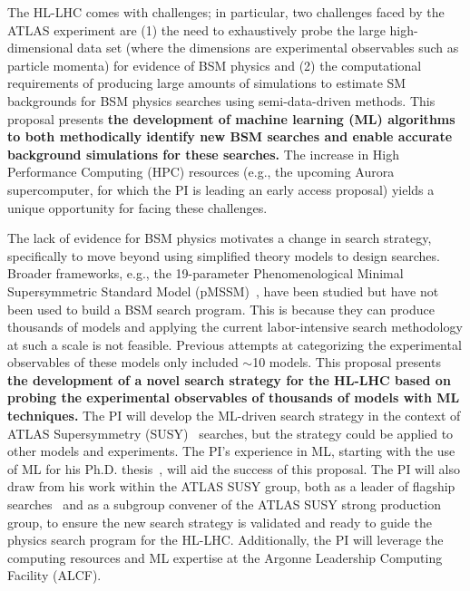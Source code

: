 \documentclass[letter, USenglish, 11pt, subfigure]{article}
\begin{document}
The HL-LHC comes with challenges; in particular, two challenges faced by the ATLAS experiment are (1) the need to exhaustively probe the large high-dimensional data set (where the dimensions are experimental observables such as particle momenta) for evidence of BSM physics and (2) the computational requirements of producing large amounts of simulations to estimate SM backgrounds for BSM physics searches using semi-data-driven methods. This proposal presents {\bf the development of machine learning (ML) algorithms to both methodically identify new BSM searches and enable accurate background simulations for these searches.} The increase in High Performance Computing (HPC) resources (e.g., the upcoming Aurora supercomputer, for which the PI is leading an early access proposal) yields a unique opportunity for facing these challenges.

The lack of evidence for BSM physics motivates a change in search strategy, specifically to move beyond using simplified theory models to design searches. Broader frameworks, e.g., the 19-parameter Phenomenological 
Minimal Supersymmetric Standard Model (pMSSM)~\cite{Djouadi_2007,Berger:2008cq,Cahill_Rowley_2012}, have been studied but have not been used to build a BSM search program. This is because they can produce thousands of models and applying the current labor-intensive search methodology at such a scale is not feasible. Previous attempts at categorizing the experimental observables of these models only included $\sim$10 models. This proposal presents {\bf the development of a novel search strategy for the HL-LHC based on probing the experimental observables of thousands of models with ML techniques.} The PI will develop the ML-driven search strategy in the context of ATLAS Supersymmetry (SUSY)~\cite{Golfand:1971iw,Volkov:1973ix,Wess:1974tw,Wess:1974jb,Ferrara:1974pu,Salam:1974ig} searches, but the strategy could be applied to other models and experiments. The PI's experience in ML, starting with the use of ML for his Ph.D. thesis~\cite{Aaltonen:2011fi,Aaltonen:2013as}, will aid the success of this proposal. The PI will also draw from his work within the ATLAS SUSY group, both as a leader of flagship searches~\cite{stop0L_1,stopRun1,stop0L_2,stop0L_3} and as a subgroup convener of the ATLAS SUSY strong production group, to ensure the new search strategy is validated and ready to guide the physics search program for the HL-LHC. Additionally, the PI will leverage the computing resources and ML expertise at the Argonne Leadership Computing Facility (ALCF).
\end{document}
